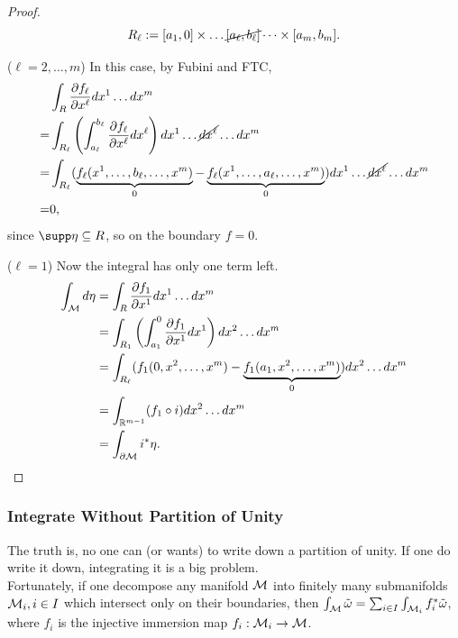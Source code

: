 \documentclass[../main.tex]{subfiles}
\begin{document}
\begin{proof}
\[        R_\ell := [a_1, 0] \times \dots \cancel{[a_\ell, b_\ell]} \dots 
        \times [a_m, b_m].
        \]\par
        (\(\ell = 2,\dots, m\)) In this case, by Fubini and FTC, 
        \[
        \begin{aligned}
            &\int_{R}^{}\frac{\partial f_\ell}{\partial x^\ell}dx^1\dots dx^m\\
            =&\int_{R_\ell}^{}\left(\int_{a_\ell}^{b_\ell} 
            \frac{\partial f_\ell}{\partial x^\ell}dx^\ell\right)dx^1\dots
            \cancel{dx^\ell}\dots dx^m \\
            =&\int_{R_\ell}^{}
            (\underbrace{f_\ell(x^1, \dots, b_\ell, \dots, x^m)}_{0}
             - \underbrace{f_\ell(x^1, \dots, a_\ell, \dots, x^m)}_{0})
            dx^1\dots \cancel{dx^\ell}\dots dx^m \\
            =&0, 
        \end{aligned}
        \]
        since \(\supp\eta \subseteq R\), so on the boundary \(f=0\). \par
        (\(\ell = 1\)) Now the integral has only one term left.
        \[
        \begin{aligned}
            \int_{\manifold[M]}^{} d\eta &= 
            \int_{R}^{} \frac{\partial f_1}{\partial x^1}dx^1\dots dx^m \\
            &=\int_{R_1}^{} \left(\int_{a_1}^{0}\frac{\partial f_1}{\partial x^1}
            dx^1\right)dx^2\dots dx^m \\
            &=\int_{R_\ell}^{}
            (f_1(0, x^2, \dots, x^m) - \underbrace{f_1(a_1, x^2, \dots, x^m)}_{0})
            dx^2\dots dx^m \\
            &=\int_{\mathbb{R}^{m-1}}^{} (f_1\circ i) dx^2\dots dx^m \\
            &=\int_{\partial \manifold[M]}^{} i^*\eta.
        \end{aligned}
        \]
    \end{proof}
    \subsubsection{Integrate Without Partition of Unity}
    \begin{remark}
        The truth is, no one can (or wants) to write down a partition of unity. 
        If one do write it down, integrating it is a big problem. \\
        Fortunately, if one decompose any manifold \(\manifold[M]\) into finitely 
        many submanifolds \(\manifold[M]_i, i \in I\) which intersect only on their 
        boundaries, then \(\int_{\manifold[M]}\pseudo{\omega} = \sum_{i \in I} 
        \int_{\manifold[M]_i}f_i^*\pseudo{\omega}\), where \(f_i\) is the injective 
        immersion map \(f_i : \manifold[M]_i \to \manifold[M]\).
    \end{remark}
    
\end{document}
